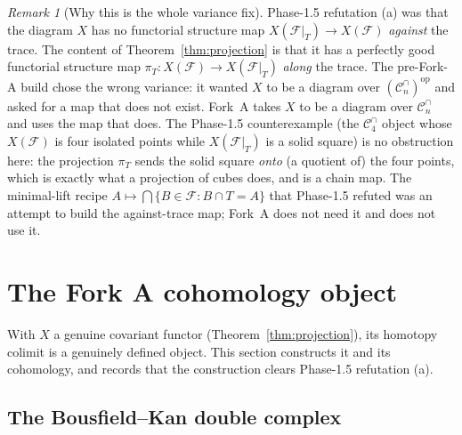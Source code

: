 \documentclass[11pt,oneside]{amsart}
\theoremstyle{plain}
\theoremstyle{definition}
\theoremstyle{remark}
\newtheorem{remark}[theorem]{Remark}
\theoremstyle{honeststyle}
\newcommand{\F}{\mathcal{F}}
\newcommand{\Cn}{\mathcal{C}^{\cap}_n}
\begin{document}
\begin{remark}[Why this is the whole variance fix]
\label{rem:variance-fix}
Phase-1.5 refutation (a) was that the diagram $X$ has no functorial
structure map $X(\F|_T)\to X(\F)$ \emph{against} the trace. The
content of Theorem~\ref{thm:projection} is that it has a perfectly good
functorial structure map $\pi_T\colon X(\F)\to X(\F|_T)$ \emph{along}
the trace. The pre-Fork-A build chose the wrong variance: it wanted
$X$ to be a diagram over $(\Cn)^{\mathrm{op}}$ and asked for a map that
does not exist. Fork~A takes $X$ to be a diagram over $\Cn$ and uses
the map that does. The Phase-1.5 counterexample (the
$\mathcal C^{\cap}_4$ object whose $X(\F)$ is four isolated points
while $X(\F|_T)$ is a solid square) is no obstruction here: the
projection $\pi_T$ sends the solid square \emph{onto} (a quotient of)
the four points, which is exactly what a projection of cubes does, and
is a chain map. The minimal-lift recipe $A\mapsto\bigcap\{B\in\F:B\cap
T=A\}$ that Phase-1.5 refuted was an attempt to build the
against-trace map; Fork~A does not need it and does not use it.
\end{remark}

\section{The Fork A cohomology object}
\label{sec:object}

With $X$ a genuine covariant functor (Theorem~\ref{thm:projection}),
its homotopy colimit is a genuinely defined object. This section
constructs it and its cohomology, and records that the construction
clears Phase-1.5 refutation (a).

\subsection{The Bousfield--Kan double complex}
\label{ssec:bk}
\end{document}
